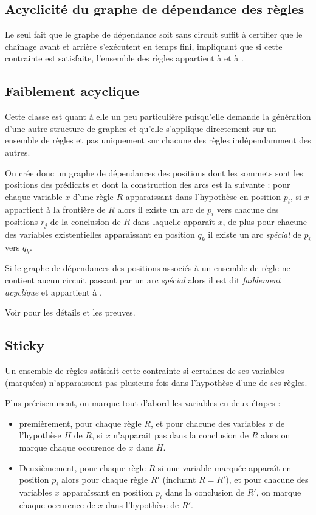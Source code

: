 

\subsection{Acyclicité du graphe de dépendance des règles}\label{classe_agrd}
Le seul fait que le graphe de dépendance soit sans circuit suffit à certifier que le chaînage
avant et arrière s'exécutent en temps fini, impliquant que si cette contrainte est satisfaite,
l'ensemble des règles appartient à \fes et à \fus.

\subsection{Faiblement acyclique}\label{classe_wa}
Cette classe est quant à elle un peu particulière puisqu'elle demande la génération d'une autre
structure de graphes et qu'elle s'applique directement sur un ensemble de règles et pas
uniquement sur chacune des règles indépendamment des autres.

On crée donc un graphe de dépendances des positions dont les sommets sont les positions
des prédicats et dont la construction des arcs est la suivante : pour chaque variable
$x$ d'une règle $R$ apparaissant dans l'hypothèse en position $p_i$, 
si $x$ appartient à la frontière de $R$ alors il existe un arc de $p_i$ vers chacune des
positions $r_j$ de la conclusion de $R$ dans laquelle apparaît $x$, de plus pour chacune
des variables existentielles apparaîssant en position $q_k$ il existe un arc {\em
spécial} de $p_i$ vers $q_k$.

Si le graphe de dépendances des positions associés à un ensemble de règle ne contient
aucun circuit passant par un arc {\em spécial} alors il est dit {\em faiblement
acyclique} et appartient à \fes.

Voir \cite{nonguarded} pour les détails et les preuves. 

\subsection{Sticky}\label{classe_sticky}
Un ensemble de règles satisfait cette contrainte si certaines de ses variables (marquées)
n'apparaissent pas plusieurs fois dans l'hypothèse d'une de ses règles.

Plus précisemment, on marque tout d'abord les variables en deux étapes :\\
\begin{itemize}
\item premièrement, pour chaque règle $R$, et pour chacune des variables $x$ de l'hypothèse 
$H$ de $R$, si $x$ n'apparait pas dans la conclusion de $R$ alors on marque chaque 
occurence de $x$ dans $H$.
\item Deuxièmement, pour chaque règle $R$ si une variable marquée apparaît en position $p_i$
alors pour chaque règle $R'$ (incluant $R = R'$), et pour chacune des variables $x$
apparaîssant en position $p_i$ dans la conclusion de $R'$, on marque chaque occurence de
$x$ dans l'hypothèse de $R'$.\\
\end{itemize}

